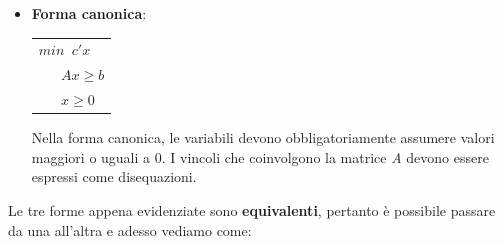 \documentclass[11pt]{book}
\begin{document}
\begin{itemize}
\item {\bf Forma canonica}:

  \begin{center}
    \begin{tabular}{l}
      $min\phantom{a}c'x$ \\
      $\phantom{aaa}Ax \geq b$ \\
      $\phantom{aaa}x \geq 0$ \\      
    \end{tabular}
  \end{center}

  Nella forma canonica, le variabili devono obbligatoriamente assumere
  valori maggiori o uguali a 0. I vincoli che coinvolgono la matrice
  {\em A} devono essere espressi come disequazioni.
  
\end{itemize}

Le tre forme appena evidenziate sono {\bf equivalenti}, pertanto \`e
possibile passare da una all'altra e adesso vediamo come:
\end{document}

